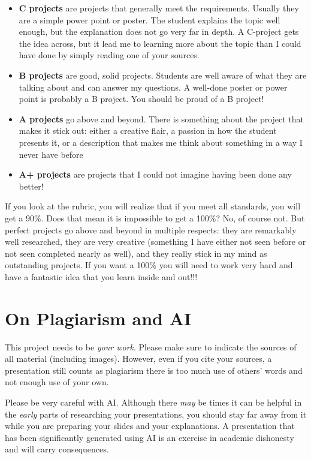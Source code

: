 \documentclass[11pt]{exam}
\begin{document}
  \begin{itemize}
    \item {\bf C projects} are projects that generally meet the requirements.  Usually they are a simple power point or poster.  The student explains the topic well enough, but the explanation does not go very far in depth.  A C-project gets the idea across, but it lead me to learning more about the topic than I could have done by simply reading one of your sources.
    \item {\bf B projects} are good, solid projects.  Students are well aware of what they are talking about and can answer my questions.  A well-done poster or power point is probably a B project.  You should be proud of a B project!
    \item {\bf A projects} go above and beyond.  There is something about the project that makes it stick out: either a creative flair, a passion in how the student presents it, or a description that makes me think about something in a way I never have before
    \item {\bf A+ projects} are projects that I could not imagine having been done any better!
  \end{itemize}

If you look at the rubric, you will realize that if you meet all standards, you will get a 90\%.  Does that mean it is impossible to get a 100\%?  No, of course not.  But perfect projects go above and beyond in multiple respects: they are remarkably well researched, they are very creative (something I have either not seen before or not seen completed nearly as well), and they really stick in my mind as outstanding projects.  If you want a 100\% you will need to work very hard and have a fantastic idea that you learn inside and out!!!

\section*{On Plagiarism and AI}
This project needs to be \emph{your work}.  Please make sure to indicate the sources of all material (including images). However, even if you cite your sources, a presentation still counts as plagiarism there is too much use of others' words and not enough use of your own. 

Please be very careful with AI.  Although there \emph{may} be times it can be helpful in the \emph{early} parts of researching your presentations, you should stay far away from it while you are preparing your slides and your explanations.  A presentation that has been significantly generated using AI is an exercise in academic dishonesty and will carry consequences.
\end{document}
